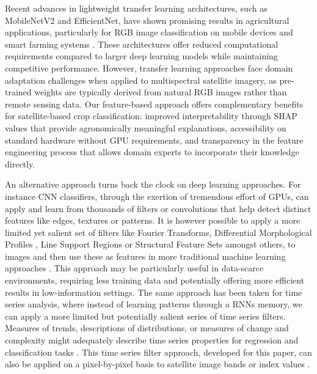 \documentclass[
  journal,
  twocolumn]{IEEEtran}
\begin{document}
Recent advances in lightweight transfer learning architectures, such as
MobileNetV2 and EfficientNet, have shown promising results in
agricultural applications, particularly for RGB image classification on
mobile devices and smart farming systems
\citep{sandler2018mobilenetv2, tan2019efficientnet}. These architectures
offer reduced computational requirements compared to larger deep
learning models while maintaining competitive performance. However,
transfer learning approaches face domain adaptation challenges when
applied to multispectral satellite imagery, as pre-trained weights are
typically derived from natural RGB images rather than remote sensing
data. Our feature-based approach offers complementary benefits for
satellite-based crop classification: improved interpretability through
SHAP values that provide agronomically meaningful explanations,
accessibility on standard hardware without GPU requirements, and
transparency in the feature engineering process that allows domain
experts to incorporate their knowledge directly.

An alternative approach turns back the clock on deep learning
approaches. For instance CNN classifiers, through the exertion of
tremendous effort of GPUs, can apply and learn from thousands of filters
or convolutions that help detect distinct features like edges, textures
or patterns. It is however possible to apply a more limited yet salient
set of filters like Fourier Transforms, Differential Morphological
Profiles \citep{pesaresi2001new}, Line Support Regions or Structural
Feature Sets \citep{huang2007classification} amongst others, to images
and then use these as features in more traditional machine learning
approaches
\citep{graesser2012image, owusu2024towards, engstrom2022poverty, chao2021evaluating, urbansci7040116}.
This approach may be particularly useful in data-scarce environments,
requiring less training data and potentially offering more efficient
results in low-information settings. The same approach has been taken
for time series analysis, where instead of learning patterns through a
RNNs memory, we can apply a more limited but potentially salient series
of time series filters. Measures of trends, descriptions of
distributions, or measures of change and complexity might adequately
describe time series properties for regression and classification tasks
\citep{christ2018time, yang2021anomaly}. This time series filter
approach, developed for this paper, can also be applied on a
pixel-by-pixel basis to satellite image bands or index values
\citep{xr_fresh_2021}.
\end{document}
